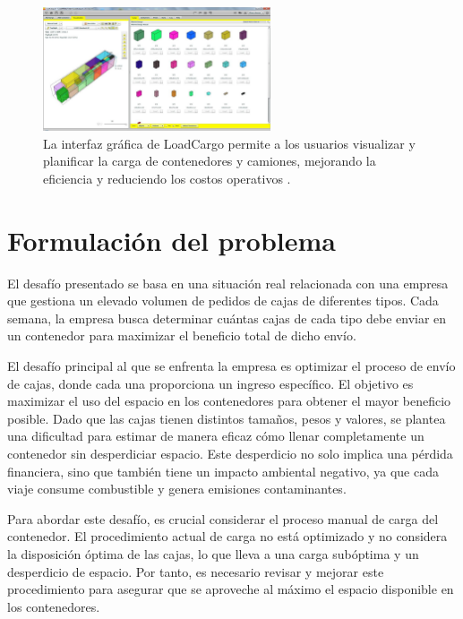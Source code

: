 \documentclass[openany]{article}
\begin{document}
\begin{figure}[H]
    \centering
    \includegraphics[width=0.6\textwidth]{Figures/loadcargo.jpg}
    \caption{La interfaz gráfica de LoadCargo permite a los usuarios visualizar y planificar la carga de contenedores y camiones, mejorando la eficiencia y reduciendo los costos operativos \parencite{loadcargo2024}.}
    \label{fig:loadcargo}
\end{figure}







\newpage



\section{Formulación del problema}
\label{sec:problem}

El desafío presentado se basa en una situación real relacionada con una empresa que gestiona un elevado volumen de pedidos de cajas de diferentes tipos. Cada semana, la empresa busca determinar cuántas cajas de cada tipo debe enviar en un contenedor para maximizar el beneficio total de dicho envío.

El desafío principal al que se enfrenta la empresa es optimizar el proceso de envío de cajas, donde cada una proporciona un ingreso específico. El objetivo es maximizar el uso del espacio en los contenedores para obtener el mayor beneficio posible. Dado que las cajas tienen distintos tamaños, pesos y valores, se plantea una dificultad para estimar de manera eficaz cómo llenar completamente un contenedor sin desperdiciar espacio. Este desperdicio no solo implica una pérdida financiera, sino que también tiene un impacto ambiental negativo, ya que cada viaje consume combustible y genera emisiones contaminantes.

Para abordar este desafío, es crucial considerar el proceso manual de carga del contenedor. El procedimiento actual de carga no está optimizado y no considera la disposición óptima de las cajas, lo que lleva a una carga subóptima y un desperdicio de espacio. Por tanto, es necesario revisar y mejorar este procedimiento para asegurar que se aproveche al máximo el espacio disponible en los contenedores.
\end{document}
